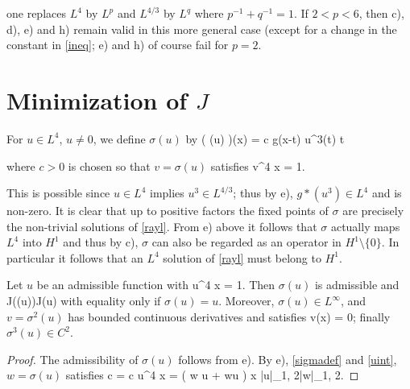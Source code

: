 one replaces $L^4$ by $L^p$ and $L^{4/3}$ by $L^q$ where $p^{-1} + q^{-1} = 1$.
If $2 < p < 6$, then c), d), e) and h) remain valid in this more general case
(except for a change in the constant in \eqref{ineq}; e) and h) of course fail
for $p=2$.

\section{Minimization of $J$}
For $u \in L^4$, $u\neq 0$, we define $\sigma(u)$ by
\be\label{sigmadef} \left( \sigma(u) \right)(x) = c \intrrr g(x-t) u^3(t) \diff
t \ee

where $c > 0$ is chosen so that $v = \sigma(u)$ satisfies
\be\label{sigmaint} \intrrr v^4 \diff x = 1.\ee

This is possible since $u \in L^4$ implies $u^3 \in L^{4/3}$; thus by e), $g
\ast (u^3) \in L^4$ and is non-zero. It is clear that up to positive factors the
fixed points of $\sigma$ are precisely the non-trivial solutions of
\eqref{rayl}. From e) above it follows that $\sigma$ actually maps $L^4$ into
$H^1$ and thus by c), $\sigma$ can also be regarded as an operator in
$H^1\setminus\{0\}$. In particular it follows that an $L^4$ solution of \eqref{rayl}
must belong to $H^1$.

\begin{lemma} Let $u$ be an admissible function with
    \be\label{uint} \intrrr u^4 \diff x = 1. \ee
    Then $\sigma(u)$ is admissible and
    \be\label{jineq} J\left(\sigma(u)\right)\leq J(u) \ee
    with equality only if $\sigma(u) = u$. Moreover, $\sigma(u) \in L^\infty$,
    and $v=\sigma^2(u)$ has bounded continuous derivatives and satisfies
    \be\label{vlim}  v(x) = 0;\ee
    finally $\sigma^3(u) \in C^2$.
\end{lemma}
\begin{proof}
The admissibility of $\sigma(u)$ follows from e). By e), \eqref{sigmadef} and
\eqref{uint}, $w=\sigma(u)$ satisfies
\be \label{cineq} c = c \intrrr u^4 \diff x = \intrrr \left( \grad w \cdot \grad
u + wu \right) \diff x \leq |u|_{1, 2}|w|_{1, 2}. \ee

\end{proof}





